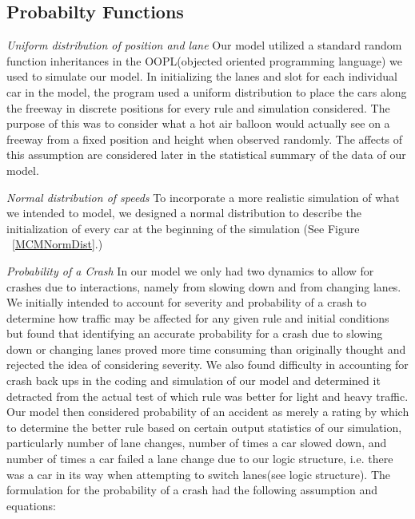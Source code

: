 \documentclass{amsart}
\begin{document}
	
	\subsection{Probabilty Functions}
		\textit{Uniform distribution of position and lane}
			Our model utilized a standard random function inheritances in the OOPL(objected oriented programming language) we used to simulate our model. In initializing the lanes and slot for each individual car in the model, the program used a uniform distribution to place the cars along the freeway in discrete positions for every rule and simulation considered. The purpose of this was to consider what a hot air balloon would actually see on a freeway from a fixed position and height when observed randomly. The affects of this assumption are considered later in the statistical summary of the data of our model. 

		\textit{Normal distribution of speeds} 
			To incorporate a more realistic simulation of what we intended to model, we designed a normal distribution to describe the initialization of every car at the beginning of the simulation (See Figure ~\ref{MCMNormDist}.)

		\textit{Probability of a Crash}
			In our model we only had two dynamics to allow for crashes due to interactions, namely from slowing down and from changing lanes. We initially intended to account for severity and probability of a crash to determine how traffic may be affected for any given rule and initial conditions but found that identifying an accurate probability for a crash due to slowing down or changing lanes proved more time consuming than originally thought and rejected the idea of considering severity. We also found difficulty in accounting for crash back ups in the coding and simulation of our model and determined it detracted from the actual test of which rule was better for light and heavy traffic. Our model then considered probability of an accident as merely a rating by which to determine the better rule based on certain output statistics of our simulation, particularly number of lane changes, number of times a car slowed down, and number of times a car failed a lane change due to our logic structure, i.e. there was a car in its way when attempting to switch lanes(see logic structure). The formulation for the probability of  a crash had the following assumption and equations:
			
\end{document}
